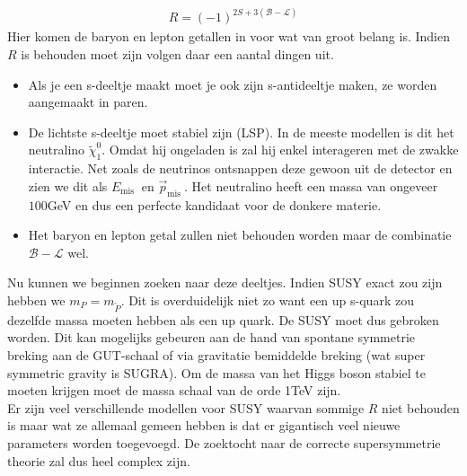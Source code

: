 \documentclass[../main.tex]{subfiles}
\begin{document}
\begin{equation}
    \begin{aligned}
        \label{eq:r_pariteit}
        R=(-1)^{2 S+3(\mathcal{B}-\mathcal{L})}
    \end{aligned}
\end{equation}
Hier komen de baryon en lepton getallen in voor wat van groot belang is. Indien $R$ is behouden moet zijn volgen daar een aantal dingen uit.
\begin{itemize}
    \item Als je een s-deeltje maakt moet je ook zijn s-antideeltje maken, ze worden aangemaakt in paren.
    \item De lichtste s-deeltje moet stabiel zijn (LSP). In de meeste modellen is dit het neutralino $\tilde{\chi}_{1}^{0}$. Omdat hij ongeladen is zal hij enkel interageren met de zwakke interactie. Net zoals de neutrinos ontsnappen deze gewoon uit de detector en zien we dit als $E_{\text {mis }}$ en $\vec{p}_{\text {mis }}$. Het neutralino heeft een massa van ongeveer $100$GeV en dus een perfecte kandidaat voor de donkere materie.
    \item Het baryon en lepton getal zullen niet behouden worden maar de combinatie $\mathcal{B}-\mathcal{L}$ wel.
\end{itemize}
Nu kunnen we beginnen zoeken naar deze deeltjes. Indien SUSY exact zou zijn hebben we $m_{P}=m_{\tilde{P}}$. Dit is overduidelijk niet zo want een up s-quark zou dezelfde massa moeten hebben als een up quark. De SUSY moet dus gebroken worden. Dit kan mogelijks gebeuren aan de hand van spontane symmetrie breking aan de GUT-schaal of via gravitatie bemiddelde breking (wat super symmetric gravity is SUGRA). Om de massa van het Higgs boson stabiel te moeten krijgen moet de massa schaal van de orde 1TeV zijn.\\
Er zijn veel verschillende modellen voor SUSY waarvan sommige $R$ niet behouden is maar wat ze allemaal gemeen hebben is dat er gigantisch veel nieuwe parameters worden toegevoegd. De zoektocht naar de correcte supersymmetrie theorie zal dus heel complex zijn.
\end{document}
